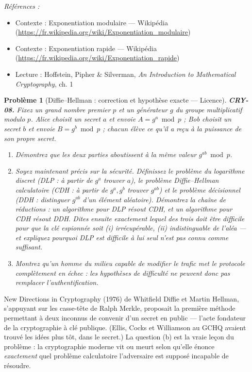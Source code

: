 \documentclass[11pt]{article}
\newtheorem{problem}{Problème}
\newenvironment{refs}{\par\small\noindent\emph{Références :}\begin{itemize}\setlength\itemsep{0pt}}{\end{itemize}\normalsize}
\begin{document}
\begin{refs}
\item Contexte : Exponentiation modulaire --- Wikipédia (\url{https://fr.wikipedia.org/wiki/Exponentiation_modulaire})
\item Contexte : Exponentiation rapide --- Wikipédia (\url{https://fr.wikipedia.org/wiki/Exponentiation_rapide})
\item Lecture : Hoffstein, Pipher \& Silverman, \textit{An Introduction to Mathematical Cryptography}, ch. 1
\end{refs}

\bigskip

\begin{problem}[{Diffie--Hellman : correction et hypothèse exacte --- Licence}]
\textbf{CRY-08.} Fixez un grand nombre premier $p$ et un générateur $g$
du groupe multiplicatif modulo $p$. Alice choisit un secret $a$ et envoie
$A = g^a \bmod p$ ; Bob choisit un secret $b$ et envoie $B = g^b \bmod p$ ; chacun
élève ce qu'il a reçu à la puissance de son propre secret.
\begin{enumerate}
\item[(a)] Démontrez que les deux parties aboutissent
à la même valeur $g^{ab} \bmod p$.
\item[(b)] Soyez maintenant précis sur la sécurité. Définissez le
problème du logarithme discret (DLP : à partir de $g^a$ trouver $a$), le problème
Diffie--Hellman calculatoire (CDH : à partir de $g^a, g^b$ trouver $g^{ab}$) et le
problème décisionnel (DDH : distinguer $g^{ab}$ d'un élément aléatoire). Démontrez la
chaîne de réductions : un algorithme pour DLP résout CDH, et un algorithme pour CDH résout
DDH. Dites ensuite exactement lequel des trois doit être difficile pour que la clé espionnée
soit (i) irrécupérable, (ii) indistinguable de l'aléa --- et expliquez pourquoi \og{} DLP est
difficile \fg{} à lui seul n'est \textit{pas} connu comme suffisant.
\item[(c)] Montrez qu'un homme du milieu capable de modifier
le trafic met le protocole complètement en échec : les hypothèses de difficulté ne peuvent
donc pas remplacer l'authentification.
\end{enumerate}

\end{problem}

\noindent \og{} New Directions in Cryptography \fg{} (1976) de Whitfield Diffie et Martin
Hellman, s'appuyant sur les casse-tête de Ralph Merkle, proposait la première méthode
permettant à deux inconnus de convenir d'un secret en public --- l'acte fondateur de la
cryptographie à clé publique. (Ellis, Cocks et Williamson au GCHQ avaient trouvé les idées
plus tôt, dans le secret.) La question (b) est la vraie leçon du problème : la cryptographie
moderne vit ou meurt selon qu'elle énonce \textit{exactement} quel problème calculatoire
l'adversaire est supposé incapable de résoudre.
\end{document}
